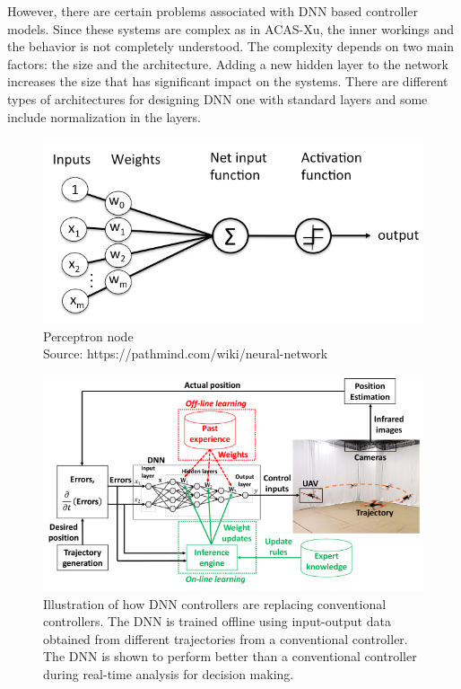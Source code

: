 However,  there are certain  problems associated with \ac{DNN} based controller models. 
Since these systems are complex as in \ac{ACAS-Xu}, the inner workings and the behavior is not completely understood. 
The complexity depends on  two main factors: the size and the architecture. Adding a new hidden layer to the network increases the size that has  significant impact on the systems.  
There are different types of architectures for designing \ac{DNN} one with standard layers and some include normalization in the layers. 


\begin{figure}
	\centering
	\includegraphics[width=0.7\linewidth]{Images/perceptron_node}
	\caption{Perceptron node  \\ Source: https://pathmind.com/wiki/neural-network}
	\label{fig:perceptronnode}
\end{figure}

\begin{figure}
	\centering
	\includegraphics[width=0.7\linewidth]{Images/DNNcontroller}
	\caption{Illustration of how DNN controllers are replacing conventional controllers. The DNN is trained offline using input-output data obtained from different trajectories from a conventional controller. The DNN is shown to perform better than a conventional controller during real-time analysis for decision making.}
	\label{fig:dnncontroller}
\end{figure}

